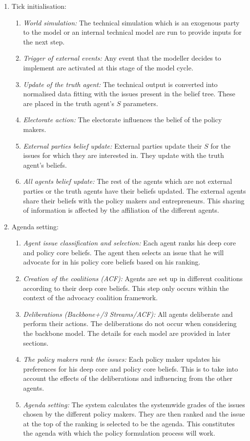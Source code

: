 \begin{enumerate}
\item Tick initialisation:
	
	\begin{enumerate}
	\item \emph{World simulation:} The technical simulation which is an exogenous party to the model or an internal technical model are run to provide inputs for the next step.
	\item \emph{Trigger of external events:} Any event that the modeller decides to implement are activated at this stage of the model cycle.
	\item \emph{Update of the truth agent:} The technical output is converted into normalised data fitting with the issues present in the belief tree. These are placed in the truth agent's $S$ parameters.
	\item \emph{Electorate action:} The electorate influences the belief of the policy makers.
	\item \emph{External parties belief update:} External parties update their $S$ for the issues for which they are interested in. They update with the truth agent's beliefs.
	\item \emph{All agents belief update:} The rest of the agents which are not external parties or the truth agents have their beliefs updated. The external agents share their beliefs with the policy makers and entrepreneurs. This sharing of information is affected by the affiliation of the different agents.
	\end{enumerate}
	
\item Agenda setting:

	\begin{enumerate}
	\item \emph{Agent issue classification and selection:} Each agent ranks his deep core and policy core beliefs. The agent then selects an issue that he will advocate for in his policy core beliefs based on his ranking.
	\item \emph{Creation of the coalitions (ACF):} Agents are set up in different coalitions according to their deep core beliefs. This step only occurs within the context of the advocacy coalition framework.
	\item \emph{Deliberations (Backbone+/3 Streams/ACF):} All agents deliberate and perform their actions. The deliberations do not occur when considering the backbone model. The details for each model are provided in later sections.
	\item \emph{The policy makers rank the issues:} Each policy maker updates his preferences for his deep core and policy core beliefs. This is to take into account the effects of the deliberations and influencing from the other agents.
	\item \emph{Agenda setting:} The system calculates the systemwide grades of the issues chosen by the different policy makers. They are then ranked and the issue at the top of the ranking is selected to be the agenda. This constitutes the agenda with which the policy formulation process will work.
	\end{enumerate}
	

\end{enumerate}
